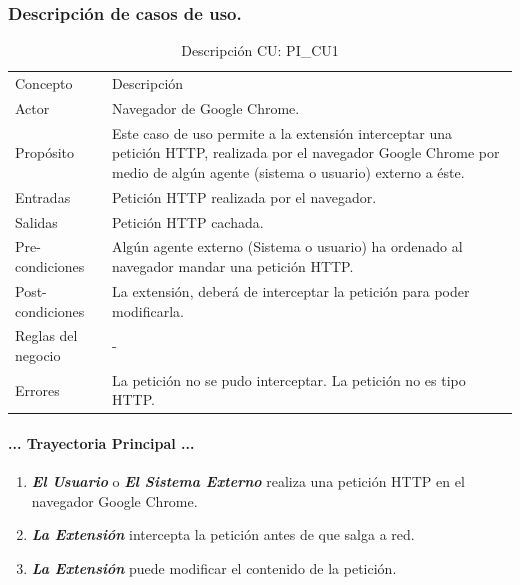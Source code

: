 \documentclass[12pt, a4paper, titlepage]{article}
\begin{document}
			\subsubsection{Descripción de casos de uso.}
			
				\begin{table}[htb]
				\begin{tabular}{ |p{3.5cm}||p{9.5cm}|}
					\hline
					\rowcolor{guindapoli}
					\multicolumn{2}{|c|}{\textbf{\textcolor{white}{Caso de uso: PI\_CU1. Interceptar petición.}}}\\
					\hline
					\rowcolor{azulfuerte}Concepto & Descripción\\
					\hline
					\cellcolor{azulclaro}Actor & 
					Navegador de Google Chrome.\\ 
					\hline
					\cellcolor{azulclaro}Propósito &
					Este caso de uso permite a la extensión interceptar una petición HTTP, realizada por el navegador Google Chrome por medio de algún agente (sistema o usuario) externo a éste.\\
					\hline
					\cellcolor{azulclaro}Entradas &
					Petición HTTP realizada por el navegador.\\
					\hline
					\cellcolor{azulclaro}Salidas &
					Petición HTTP cachada.\\
					\hline
					\cellcolor{azulclaro}Pre-condiciones&
					Algún agente externo (Sistema o usuario) ha ordenado al navegador mandar una petición HTTP.\\
					\hline
					\cellcolor{azulclaro}Post-condiciones&
					La extensión, deberá de interceptar la petición para poder modificarla.\\
					\hline
					\cellcolor{azulclaro}Reglas del negocio&
					-\\
					\hline
					\cellcolor{azulclaro}Errores &
					La petición no se pudo interceptar. \newline La petición no es tipo HTTP.\\					
					\hline
				\end{tabular}
				\caption[DCU: PI\_CU1]{Descripción CU: PI\_CU1}
				\end{table}
				
				\paragraph{... Trayectoria Principal ...}
				\begin{enumerate}
					\item \textbf{\textit{El Usuario}} o \textbf{\textit{El Sistema Externo}} realiza una petición HTTP en el navegador Google Chrome.\\
					\item \textbf{\textit{La Extensión}} intercepta la petición antes de que salga a red.\\
					\item \textbf{\textit{La Extensión}} puede modificar el contenido de la petición. \\
				\end{enumerate}
\end{document}
